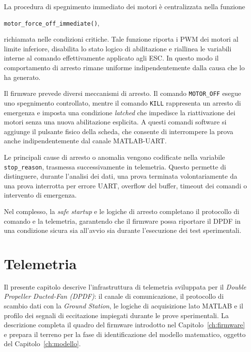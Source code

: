 \documentclass[11pt]{report}
\begin{document}
La procedura di spegnimento immediato dei motori è centralizzata nella funzione
\begin{center}
     \texttt{motor\_force\_off\_immediate()}, 
\end{center}
 richiamata nelle condizioni critiche. Tale funzione riporta i PWM dei motori al limite inferiore, disabilita lo stato logico di abilitazione e riallinea le variabili interne al comando effettivamente applicato agli ESC. In questo modo il comportamento di arresto rimane uniforme indipendentemente dalla causa che lo ha generato.

Il firmware prevede diversi meccanismi di arresto. Il comando \texttt{MOTOR\_OFF} esegue uno spegnimento controllato, mentre il comando \texttt{KILL} rappresenta un arresto di emergenza e imposta una condizione \textit{latched} che impedisce la riattivazione dei motori senza una nuova abilitazione esplicita. A questi comandi software si aggiunge il pulsante fisico della scheda, che consente di interrompere la prova anche indipendentemente dal canale MATLAB-UART.

Le principali cause di arresto o anomalia vengono codificate nella variabile \texttt{stop\_reason}, trasmessa successivamente in telemetria. Questo permette di distinguere, durante l'analisi dei dati, una prova terminata volontariamente da una prova interrotta per errore UART, overflow del buffer, timeout dei comandi o intervento di emergenza.

Nel complesso, la \textit{safe startup} e le logiche di arresto completano il protocollo di comando e la telemetria, garantendo che il firmware possa riportare il DPDF in una condizione sicura sia all'avvio sia durante l'esecuzione dei test sperimentali.
	\chapter{Telemetria}
	\label{ch:telemetria}
	
	Il presente capitolo descrive l'infrastruttura di telemetria sviluppata per il \textit{Double Propeller Ducted-Fan (DPDF)}: il canale di comunicazione, il protocollo di scambio dati con la \textit{Ground Station}, le logiche di acquisizione lato MATLAB e il profilo dei segnali di eccitazione impiegati durante le prove sperimentali. La descrizione completa il quadro del firmware introdotto nel Capitolo~\ref{ch:firmware} e prepara il terreno per la fase di identificazione del modello matematico, oggetto del Capitolo~\ref{ch:modello}.
	
\end{document}
